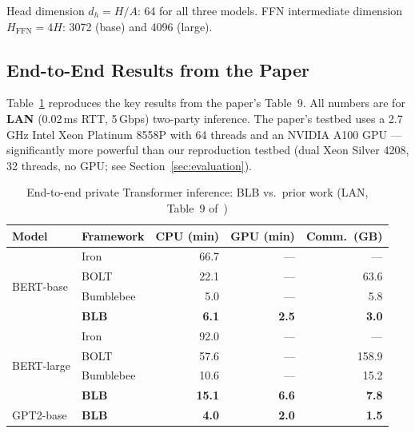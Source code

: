 {\small Head dimension $d_h = H/A$: 64 for all three models.
FFN intermediate dimension $H_{\text{FFN}} = 4H$: 3072 (base) and 4096 (large).}

\subsection{End-to-End Results from the Paper}\label{ssec:paper-results}

Table~\ref{tab:e2e-results} reproduces the key results from the paper's Table~9.
All numbers are for \textbf{LAN} (0.02\,ms RTT, 5\,Gbps) two-party inference.
The paper's testbed uses a 2.7\,GHz Intel Xeon Platinum 8558P with 64 threads and an NVIDIA A100 GPU --- significantly more powerful than our reproduction testbed (dual Xeon Silver 4208, 32 threads, no GPU; see Section~\ref{sec:evaluation}).

\begin{table}[ht]
\centering
\caption{End-to-end private Transformer inference: BLB vs.\ prior work (LAN, Table~9 of~\cite{xu2025breaking})}
\label{tab:e2e-results}
\begin{tabular}{ll rrr}
\toprule
\textbf{Model} & \textbf{Framework} & \textbf{CPU (min)} & \textbf{GPU (min)} & \textbf{Comm.\ (GB)} \\
\midrule
\multirow{4}{*}{BERT-base}
  & Iron~\cite{iron2022}        & 66.7  & ---   & ---   \\
  & BOLT~\cite{pang2024bolt}        & 22.1  & ---   & 63.6  \\
  & Bumblebee~\cite{lu2023bumblebee} & 5.0 & ---   & 5.8   \\
  & \textbf{BLB}            & \textbf{6.1} & \textbf{2.5} & \textbf{3.0} \\
\midrule
\multirow{4}{*}{BERT-large}
  & Iron~\cite{iron2022}        & 92.0  & ---   & ---   \\
  & BOLT~\cite{pang2024bolt}        & 57.6  & ---   & 158.9 \\
  & Bumblebee~\cite{lu2023bumblebee} & 10.6 & --- & 15.2  \\
  & \textbf{BLB}            & \textbf{15.1} & \textbf{6.6} & \textbf{7.8} \\
\midrule
GPT2-base
  & \textbf{BLB}            & \textbf{4.0}  & \textbf{2.0} & \textbf{1.5} \\
\bottomrule
\end{tabular}
\end{table}

